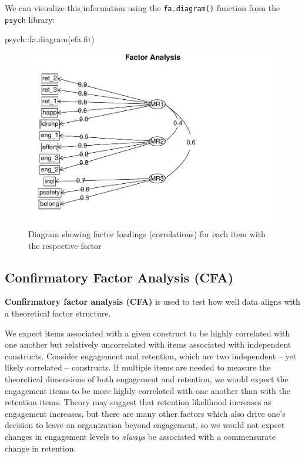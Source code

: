 \documentclass[
]{book}
\newenvironment{Shaded}{\begin{snugshade}}{\end{snugshade}}
\newcommand{\FunctionTok}[1]{\textcolor[rgb]{0.00,0.00,0.00}{#1}}
\newcommand{\NormalTok}[1]{#1}
\newcommand{\SpecialCharTok}[1]{\textcolor[rgb]{0.00,0.00,0.00}{#1}}
\begin{document}
We can visualize this information using the \texttt{fa.diagram()} function from the \texttt{psych} library:

\begin{Shaded}
\begin{Highlighting}[]
\NormalTok{psych}\SpecialCharTok{::}\FunctionTok{fa.diagram}\NormalTok{(efa.fit)}
\end{Highlighting}
\end{Shaded}

\begin{figure}

{\centering \includegraphics[width=1\linewidth]{The_Fundamentals_of_People_Analytics_files/figure-latex/fct-ld-diagram-1} 

}

\caption{Diagram showing factor loadings (correlations) for each item with the respective factor}\label{fig:fct-ld-diagram}
\end{figure}

\hypertarget{confirmatory-factor-analysis-cfa}{%
\subsection{Confirmatory Factor Analysis (CFA)}\label{confirmatory-factor-analysis-cfa}}

\textbf{Confirmatory factor analysis (CFA)} is used to test how well data aligns with a theoretical factor structure.

We expect items associated with a given construct to be highly correlated with one another but relatively uncorrelated with items associated with independent constructs. Consider engagement and retention, which are two independent -- yet likely correlated -- constructs. If multiple items are needed to measure the theoretical dimensions of both engagement and retention, we would expect the engagement items to be more highly correlated with one another than with the retention items. Theory may suggest that retention likelihood increases as engagement increases, but there are many other factors which also drive one's decision to leave an organization beyond engagement, so we would not expect changes in engagement levels to \emph{always} be associated with a commensurate change in retention.
\end{document}
